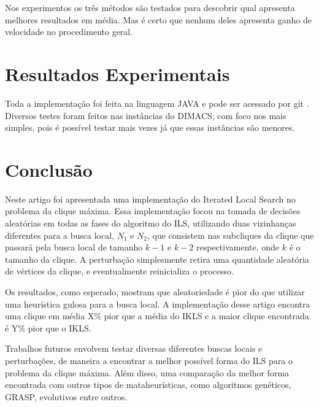 \documentclass{article}
\begin{document}
Nos experimentos os três métodos são testados para descobrir qual apresenta melhores resultados em média. Mas é certo que nenhum deles apresenta ganho de velocidade no procedimento geral.

\section{Resultados Experimentais}

Toda a implementação foi feita na linguagem JAVA e pode ser acessado por git \cite{git}. Diversos testes foram feitos nas instâncias do DIMACS, com foco nos mais simples, pois é possível testar mais vezes já que essas instâncias são menores.

\section{Conclusão}

Neste artigo foi apresentada uma implementação do Iterated Local Search no problema da clique máxima. Essa implementação focou na tomada de decisões aleatórias em todas as fases do algoritmo do ILS, utilizando duas vizinhanças diferentes para a busca local, $N_1$ e $N_2$, que consistem nas subcliques da clique que passará pela busca local de tamanho $k-1$ e $k-2$ respectivamente, onde $k$ é o tamanho da clique. A perturbação simplesmente retira uma quantidade aleatória de vértices da clique, e eventualmente reinicializa o processo.\par

Os resultados, como esperado, mostram que aleatoriedade é pior do que utilizar uma heurística gulosa para a busca local. A implementação desse artigo encontra uma clique em média X\% pior que a média do IKLS \cite{kopt} e a maior clique encontrada é Y\% pior que o IKLS. \par

Trabalhos futuros envolvem testar diversas diferentes buscas locais e perturbações, de maneira a encontrar a melhor possível forma do ILS para o problema da clique máxima. Além disso, uma comparação da melhor forma encontrada com outros tipos de mataheurísticas, como algoritmos genéticos, GRASP, evolutivos entre outros.
\end{document}

